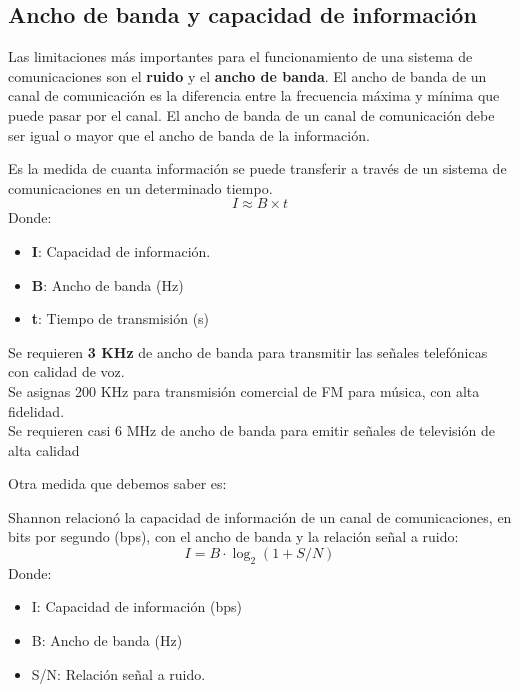 \documentclass[12pt,fleqn,a4paper,oneside]{LegrandOrangeBook}
\begin{document}
\subsection*{Ancho de banda y capacidad de información}
Las limitaciones más importantes para el funcionamiento de una sistema de comunicaciones son el \textbf{ruido} y el \textbf{ancho de banda}. El ancho de banda de un canal de comunicación es la diferencia entre la frecuencia máxima y mínima que puede pasar por el canal. El ancho de banda de un canal de comunicación debe ser igual o mayor que el ancho de banda de la información.
\begin{definition}
Es la medida de cuanta información se puede transferir a través de un sistema de comunicaciones en un determinado tiempo.
\begin{equation}
I\approx B\times t
\label{eq:hartley}
\end{equation}
Donde:
\begin{itemize}
\item \textbf{I}: Capacidad de información.
\item \textbf{B}: Ancho de banda (Hz)
\item \textbf{t}: Tiempo de transmisión (s)
\end{itemize}
\end{definition}
\begin{notation}
Se requieren \textbf{3 KHz} de ancho de banda para transmitir las señales telefónicas con calidad de voz.\\
Se asignas 200 KHz para transmisión comercial de FM para música, con alta fidelidad.\\
Se requieren casi 6 MHz de ancho de banda para emitir señales de televisión de alta calidad
\end{notation}
Otra medida que debemos saber es:
\begin{definition}
Shannon relacionó la capacidad de información de un canal de comunicaciones, en bits por segundo (bps), con el ancho de banda y la relación señal a ruido: 
\begin{equation}
I=B\cdot\log_2(1+S/N)
\label{eq:shannon}
\end{equation}
Donde:
\begin{itemize}
\item I: Capacidad de información (bps)
\item B: Ancho de banda (Hz)
\item S/N: Relación señal a ruido.
\end{itemize}
\end{definition}
\end{document}
